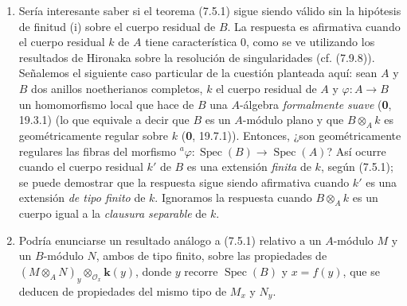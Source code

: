 \begin{remarks}[7.5.4]
\begin{enumerate}
\item[(i)] Sería interesante saber si el teorema (7.5.1) sigue
siendo válido sin la hipótesis de finitud (i) sobre el cuerpo residual
de $B$. La respuesta es afirmativa cuando el cuerpo residual $k$ de
$A$ tiene característica 0, como se ve utilizando los resultados de
Hironaka sobre la resolución de singularidades (cf. (7.9.8)).
Señalemos el siguiente caso particular de la cuestión planteada aquí:
sean $A$ y $B$ dos anillos noetherianos completos, $k$ el cuerpo
residual de $A$ y $\varphi:A\to B$ un homomorfismo local que hace de
$B$ una $A$-álgebra \emph{formalmente suave} (\textbf{0}, 19.3.1) (lo que equivale a
decir que $B$ es un $A$-módulo plano y que $B\otimes_A k$ es
geométricamente regular sobre $k$ (\textbf{0}, 19.7.1)). Entonces, ¿son
geométricamente regulares las fibras del morfismo
${}^a\varphi:\operatorname{Spec}(B)\to\operatorname{Spec}(A)$?
Así ocurre cuando el cuerpo residual $k'$ de $B$ es una extensión
\emph{finita} de $k$, según (7.5.1); se puede demostrar que la respuesta
sigue siendo afirmativa cuando $k'$ es una extensión \emph{de tipo finito}
de $k$. Ignoramos la respuesta cuando $B\otimes_A k$ es un cuerpo
igual a la \emph{clausura separable} de $k$.

\item[(ii)] Podría enunciarse un resultado análogo a (7.5.1)
relativo a un $A$-módulo $M$ y un $B$-módulo $N$, ambos de tipo finito,
sobre las propiedades de
$(M\otimes_A N)_y\otimes_{\mathscr O_x}\boldsymbol{k}(y)$,
donde $y$ recorre $\operatorname{Spec}(B)$ y $x=f(y)$, que se deducen
de propiedades del mismo tipo de $M_x$ y $N_y$.


\end{enumerate}
\end{remarks}
